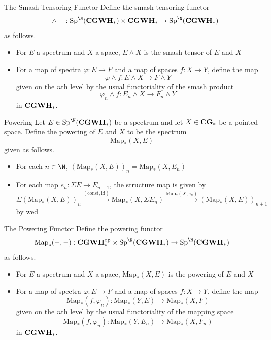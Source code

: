 \documentclass[a4paper]{article}
\begin{document}
\begin{defn}{The Smash Tensoring Functor}{} Define the smash tensoring functor $$-\wedge-:\text{Sp}^\N(\bold{CGWH}_\ast)\times\bold{CGWH}_\ast\to\text{Sp}^\N(\bold{CGWH}_\ast)$$ as follows. 
\begin{itemize}
\item For $E$ a spectrum and $X$ a space, $E\wedge X$ is the smash tensor of $E$ and $X$
\item For a map of spectra $\varphi:E\to F$ and a map of spaces $f:X\to Y$, define the map $$\varphi\wedge f:E\wedge X\to F\wedge Y$$ given on the $n$th level by the usual functoriality of the smash product $$\varphi_n\wedge f:E_n\wedge X\to F_n\wedge Y$$ in $\bold{CGWH}_\ast$. 
\end{itemize}
\end{defn}

\begin{defn}{Powering}{} Let $E\in\text{Sp}^\N(\bold{CGWH}_\ast)$ be a spectrum and let $X\in\bold{CG}_\ast$ be a pointed space. Define the powering of $E$ and $X$ to be the spectrum $$\text{Map}_\ast(X,E)$$ given as follows. 
\begin{itemize}
\item For each $n\in\N$, $(\text{Map}_\ast(X,E))_n=\text{Map}_\ast(X,E_n)$
\item For each map $e_n:\Sigma E\to E_{n+1}$, the structure map is given by $$\Sigma(\text{Map}_\ast(X,E))_n\overset{(\text{const},\text{id})}{\longrightarrow}\text{Map}_\ast(X,\Sigma E_n)\overset{\text{Map}_\ast(X,e_n)}{\longrightarrow}(\text{Map}_\ast(X,E))_{n+1}$$ by wed
\end{itemize}
\end{defn}

\begin{defn}{The Powering Functor}{} Define the powering functor $$\text{Map}_\ast(-,-):\bold{CGWH}_\ast^\text{op}\times\text{Sp}^\N(\bold{CGWH}_\ast)\to\text{Sp}^\N(\bold{CGWH}_\ast)$$ as follows. 
\begin{itemize}
\item For $E$ a spectrum and $X$ a space, $\text{Map}_\ast(X,E)$ is the powering of $E$ and $X$
\item For a map of spectra $\varphi:E\to F$ and a map of spaces $f:X\to Y$, define the map $$\text{Map}_\ast(f,\varphi_n):\text{Map}_\ast(Y,E)\to\text{Map}_\ast(X,F)$$ given on the $n$th level by the usual functoriality of the mapping space $$\text{Map}_\ast(f,\varphi_n):\text{Map}_\ast(Y,E_n)\to\text{Map}_\ast(X,F_n)$$ in $\bold{CGWH}_\ast$. 
\end{itemize}
\end{defn}
\end{document}
